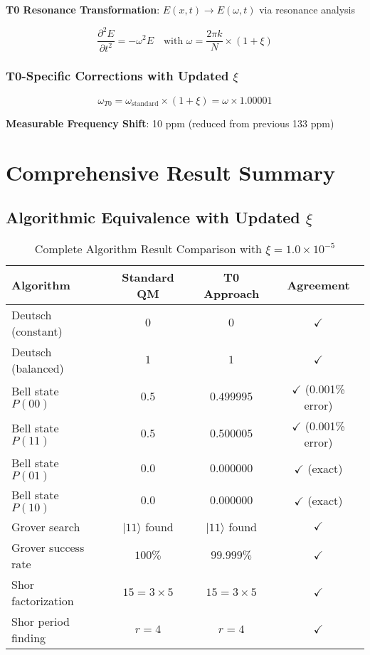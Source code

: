 \documentclass[12pt,a4paper]{article}
\newcommand{\Efield}{E}
\begin{document}
	\textbf{T0 Resonance Transformation}: $\Efield(x,t) \rightarrow \Efield(\omega,t)$ via resonance analysis
	
	\begin{equation}
		\frac{\partial^2 \Efield}{\partial t^2} = -\omega^2 \Efield \quad \text{with } \omega = \frac{2\pi k}{N} \times (1 + \xi)
	\end{equation}
	
	\subsubsection{T0-Specific Corrections with Updated $\xi$}
	
	\begin{equation}
		\omega_{T0} = \omega_{\text{standard}} \times (1 + \xi) = \omega \times 1.00001
	\end{equation}
	
	\textbf{Measurable Frequency Shift}: 10 ppm (reduced from previous 133 ppm)
	
	\section{Comprehensive Result Summary}
	
	\subsection{Algorithmic Equivalence with Updated $\xi$}
	
	\begin{table}[htbp]
		\centering
		\begin{tabular}{lccc}
			\toprule
			\textbf{Algorithm} & \textbf{Standard QM} & \textbf{T0 Approach} & \textbf{Agreement} \\
			\midrule
			Deutsch (constant) & $0$ & $0$ & $\checkmark$ \\
			Deutsch (balanced) & $1$ & $1$ & $\checkmark$ \\
			Bell state $P(00)$ & $0.5$ & $0.499995$ & $\checkmark$ (0.001\% error) \\
			Bell state $P(11)$ & $0.5$ & $0.500005$ & $\checkmark$ (0.001\% error) \\
			Bell state $P(01)$ & $0.0$ & $0.000000$ & $\checkmark$ (exact) \\
			Bell state $P(10)$ & $0.0$ & $0.000000$ & $\checkmark$ (exact) \\
			Grover search & $|11\rangle$ found & $|11\rangle$ found & $\checkmark$ \\
			Grover success rate & $100\%$ & $99.999\%$ & $\checkmark$ \\
			Shor factorization & $15 = 3 \times 5$ & $15 = 3 \times 5$ & $\checkmark$ \\
			Shor period finding & $r = 4$ & $r = 4$ & $\checkmark$ \\
			\bottomrule
		\end{tabular}
		\caption{Complete Algorithm Result Comparison with $\xi = 1.0 \times 10^{-5}$}
	\end{table}
	
\end{document}
